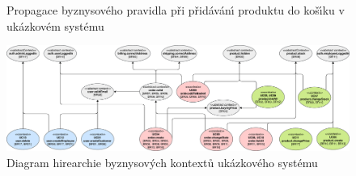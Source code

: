 \begin{figure}
    \centering
    \caption{Propagace byznysového pravidla při přidáván\'{\i} produktu do koš\'{\i}ku v ukázkovém systému}
    \label{fig:example-screenshot}
\end{figure}


\begin{figure}
    \centering
    \includegraphics[keepaspectratio=true, width=\linewidth]{figures/example-system-context-hierarchy.pdf}
    \caption{Diagram hirearchie byznysov\'ych kontextů ukázkového systému}
    \label{fig:example-system-context-hirearchy}
\end{figure}